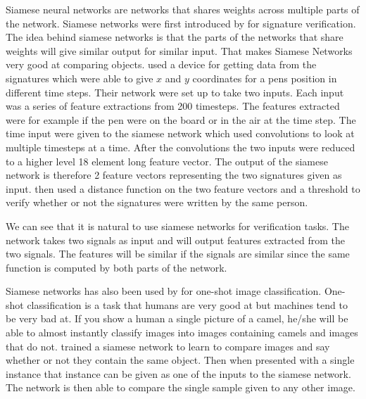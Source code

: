 Siamese neural networks are networks that shares weights across multiple parts
of the network. Siamese networks were first introduced by \citet{NIPS1993_769}
for signature verification. The idea behind siamese networks is that the parts
of the networks that share weights will give similar output for similar input.
That makes Siamese Networks very good at comparing objects. \citet{NIPS1993_769}
used a device for getting data from the signatures which were able to give $x$
and $y$ coordinates for a pens position in different time steps. Their network
were set up to take two inputs. Each input was a series of feature extractions
from 200 timesteps. The features extracted were for example if the pen were
on the board or in the air at the time step. The time input were given to the
siamese network which used convolutions to look at multiple timesteps at a time.
After the convolutions the two inputs were reduced to a higher level 18 element
long feature vector. The output of the siamese network is therefore 2 feature
vectors representing the two signatures given as input. \citet{NIPS1993_769}
then used a distance function on the two feature vectors and a threshold to
verify whether or not the signatures were written by the same person.

We can see that it is natural to use siamese networks for verification tasks.
The network takes two signals as input and will output features extracted from
the two signals. The features will be similar if the signals are similar since
the same function is computed by both parts of the network.

Siamese networks has also been used by \citet{Koch2015SiameseNN} for one-shot
image classification. One-shot classification is a task that humans are very
good at but machines tend to be very bad at. If you show a human a single
picture of a camel, he/she will be able to almost instantly classify images
into images containing camels and images that do not. \citet{Koch2015SiameseNN}
trained a siamese network to learn to compare images and say whether or not
they contain the same object. Then when presented with a single instance that
instance can be given as one of the inputs to the siamese network. The network
is then able to compare the single sample given to any other image.

